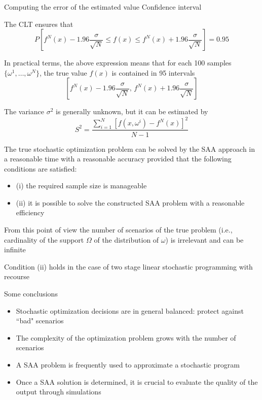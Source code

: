 \begin{frame}{Computing the error of the estimated value}
{Confidence interval}

The CLT ensures that
\[
P\left[f^N(x) - 1.96\frac{\sigma}{\sqrt{N}} \leq f(x) \leq f^N(x) + 1.96\frac{\sigma}{\sqrt{N}}\right]= 0.95
\]
\pula

In practical terms, the above expression  means that for each 100 samples $\{\omega^1,\ldots,\omega^N\}$, the true value $f(x)$ is contained in 95 intervals
\[
\left[f^N(x) - 1.96\frac{\sigma}{\sqrt{N}} ,\, f^N(x) + 1.96\frac{\sigma}{\sqrt{N}}\right]
\]
\pula

The variance  $\sigma^2$ is generally unknown, but it can be estimated by
\[
S^2 = \frac{\sum_{i=1}^N [f(x,\omega^i) - f^N(x)]^2}{N-1}
\]
 \end{frame}


\begin{frame}{ }
The true stochastic optimization problem can be solved by
the SAA approach in a reasonable time with a reasonable accuracy provided
that the following conditions are satisfied:
\begin{itemize}
\item  (i) the required sample size is
manageable
\item  (ii) it is possible to solve the constructed SAA problem with
a reasonable efficiency
\end{itemize}
\pula

From this point of view the number of scenarios of
the true problem (i.e., cardinality of the support $\Omega$ of the distribution of $\omega$)
is irrelevant and can be infinite
\pula

Condition (ii) holds in the case of two
stage linear stochastic programming with recourse

\end{frame}


\begin{frame} {Some conclusions}
\begin{itemize}

\item Stochastic optimization decisions are in general balanced: protect against ``bad" scenarios
\pula


\item The complexity of the optimization problem grows with the number of
scenarios
\pula

\item A SAA problem is frequently used to approximate a stochastic program
\pula

\item Once a SAA solution is determined, it is crucial to evaluate the quality of the output through simulations
\end{itemize}

\end{frame}
